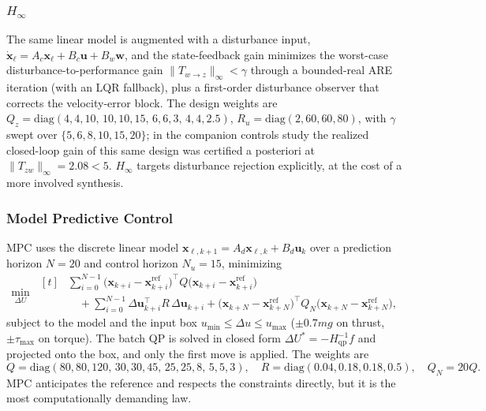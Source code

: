 \documentclass[12pt,a4paper]{article}
\begin{document}
\subsubsection{$H_\infty$}
The same linear model is augmented with a disturbance input,
$\dot{\mathbf{x}}_\ell = A_c\mathbf{x}_\ell + B_c\mathbf{u} + B_w\mathbf{w}$, and the
state-feedback gain minimizes the worst-case disturbance-to-performance gain
$\lVert T_{w\to z}\rVert_\infty < \gamma$ through a bounded-real ARE iteration (with an
LQR fallback), plus a first-order disturbance observer that corrects the velocity-error
block. The design weights are $Q_z=\mathrm{diag}(4,4,10,\,10,10,15,\,6,6,3,\,4,4,2.5)$,
$R_u=\mathrm{diag}(2,60,60,80)$, with $\gamma$ swept over $\{5,6,8,10,15,20\}$; in the
companion controls study the realized closed-loop gain of this same design was certified
a posteriori at $\lVert T_{zw}\rVert_\infty = 2.08 < 5$. $H_\infty$ targets disturbance rejection
explicitly, at the cost of a more involved synthesis.

\subsubsection{Model Predictive Control}
MPC uses the discrete linear model
$\mathbf{x}_{\ell,k+1}=A_d\mathbf{x}_{\ell,k}+B_d\mathbf{u}_k$ over a prediction horizon
$N=20$ and control horizon $N_u=15$, minimizing
\begin{equation}
    \min_{\Delta U}\;
    \begin{aligned}[t]
        &\sum_{i=0}^{N-1}\big(\mathbf{x}_{k+i}-\mathbf{x}^{\mathrm{ref}}_{k+i}\big)^{\top}Q\big(\mathbf{x}_{k+i}-\mathbf{x}^{\mathrm{ref}}_{k+i}\big) \\
        &\quad + \sum_{i=0}^{N-1}\Delta\mathbf{u}_{k+i}^{\top}R\,\Delta\mathbf{u}_{k+i}
            + \big(\mathbf{x}_{k+N}-\mathbf{x}^{\mathrm{ref}}_{k+N}\big)^{\top}Q_N\big(\mathbf{x}_{k+N}-\mathbf{x}^{\mathrm{ref}}_{k+N}\big),
    \end{aligned}
    \label{eq:mpc}
\end{equation}
subject to the model and the input box $u_{\min}\le\Delta u\le u_{\max}$ ($\pm 0.7mg$ on
thrust, $\pm\tau_{\max}$ on torque). The batch QP is solved in closed form
$\Delta U^{\ast}=-H_{\mathrm{qp}}^{-1}f$ and projected onto the box, and only the first
move is applied. The weights are
\begin{equation*}
    Q=\mathrm{diag}(80,80,120,\,30,30,45,\,25,25,8,\,5,5,3),\quad
    R=\mathrm{diag}(0.04,0.18,0.18,0.5),\quad Q_N=20Q.
\end{equation*}
MPC anticipates the reference and respects the constraints directly, but it is the most
computationally demanding law.
\end{document}
